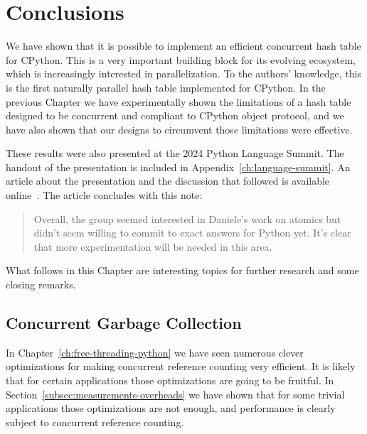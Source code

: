 \chapter{Conclusions}\label{ch:conclusions}

We have shown that it is possible to implement an efficient concurrent hash table for CPython.
This is a very important building block for its evolving ecosystem, which is increasingly interested in parallelization.
To the authors' knowledge, this is the first naturally parallel hash table implemented for CPython.
In the previous Chapter we have experimentally shown the limitations of a hash table designed to be concurrent and compliant to CPython object protocol, and we have also shown that our designs to circumvent those limitations were effective.

These results were also presented at the 2024 Python Language Summit.
The handout of the presentation is included in Appendix~\ref{ch:language-summit}.
An article about the presentation and the discussion that followed is available online~\cite{python-summit-2024-free-threading-ecosystems}.
The article concludes with this note:
\begin{quote}
    Overall, the group seemed interested in Daniele's work on atomics but didn't seem willing to commit to exact answers for Python yet.
    It's clear that more experimentation will be needed in this area.
\end{quote}

What follows in this Chapter are interesting topics for further research and some closing remarks.




\section{Concurrent Garbage Collection}\label{sec:concurrent-garbage-collection}

In Chapter~\ref{ch:free-threading-python} we have seen numerous clever optimizations for making concurrent reference counting very efficient.
It is likely that for certain applications those optimizations are going to be fruitful.
In Section~\ref{subsec:measurements-overheads} we have shown that for some trivial applications those optimizations are not enough, and performance is clearly subject to concurrent reference counting.

